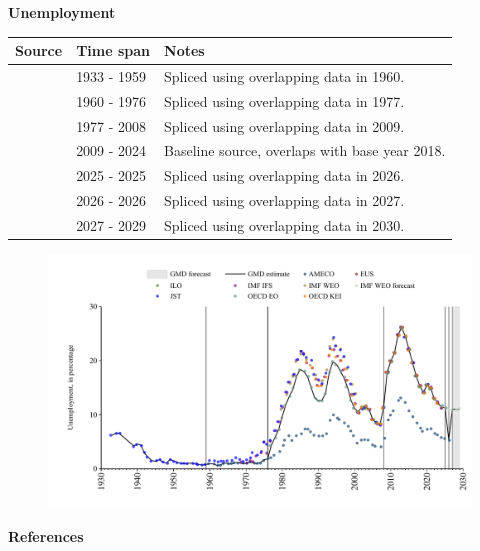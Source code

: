 \documentclass[12pt,a4paper,landscape]{article}
\begin{document}
\begin{adjustbox}{max totalsize={\paperwidth}{\paperheight},center}
\begin{minipage}[t][\textheight][t]{\textwidth}
\vspace*{0.5cm}
{}
\begin{center}
{\Large\bfseries Unemployment}
\end{center}
\vspace{0.5cm}
\begin{table}[H]
\centering
\small
\begin{tabular}{|l|l|l|}
\hline
\textbf{Source} & \textbf{Time span} & \textbf{Notes} \\
\hline
\rowcolor{white}\cite{JST}& 1933 - 1959 &Spliced using overlapping data in 1960. \\
\rowcolor{lightgray}\cite{AMECO}& 1960 - 1976 &Spliced using overlapping data in 1977. \\
\rowcolor{white}\cite{OECD_EO}& 1977 - 2008 &Spliced using overlapping data in 2009. \\
\rowcolor{lightgray}\cite{EUS}& 2009 - 2024 &Baseline source, overlaps with base year 2018. \\
\rowcolor{white}\cite{OECD_EO}& 2025 - 2025 &Spliced using overlapping data in 2026. \\
\rowcolor{lightgray}\cite{AMECO}& 2026 - 2026 &Spliced using overlapping data in 2027. \\
\rowcolor{white}\cite{IMF_WEO_forecast}& 2027 - 2029 &Spliced using overlapping data in 2030. \\
\hline
\end{tabular}
\end{table}
\begin{figure}[H]
\centering
\includegraphics[width=\textwidth,height=0.6\textheight,keepaspectratio]{graphs/ESP_unemp.pdf}
\end{figure}
\end{minipage}
\end{adjustbox}
{}
\begin{center}
{\Large\bfseries References}
\end{center}
\small


\end{document}
